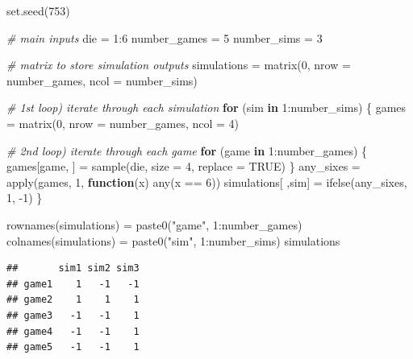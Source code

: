 \documentclass[
]{book}
\newenvironment{Shaded}{\begin{snugshade}}{\end{snugshade}}
\newcommand{\AttributeTok}[1]{\textcolor[rgb]{0.77,0.63,0.00}{#1}}
\newcommand{\CommentTok}[1]{\textcolor[rgb]{0.56,0.35,0.01}{\textit{#1}}}
\newcommand{\ConstantTok}[1]{\textcolor[rgb]{0.00,0.00,0.00}{#1}}
\newcommand{\ControlFlowTok}[1]{\textcolor[rgb]{0.13,0.29,0.53}{\textbf{#1}}}
\newcommand{\DecValTok}[1]{\textcolor[rgb]{0.00,0.00,0.81}{#1}}
\newcommand{\FunctionTok}[1]{\textcolor[rgb]{0.00,0.00,0.00}{#1}}
\newcommand{\NormalTok}[1]{#1}
\newcommand{\OtherTok}[1]{\textcolor[rgb]{0.56,0.35,0.01}{#1}}
\newcommand{\SpecialCharTok}[1]{\textcolor[rgb]{0.00,0.00,0.00}{#1}}
\newcommand{\StringTok}[1]{\textcolor[rgb]{0.31,0.60,0.02}{#1}}
\begin{document}
\begin{Shaded}
\begin{Highlighting}[]
\FunctionTok{set.seed}\NormalTok{(}\DecValTok{753}\NormalTok{)}

\CommentTok{\# main inputs}
\NormalTok{die }\OtherTok{=} \DecValTok{1}\SpecialCharTok{:}\DecValTok{6}
\NormalTok{number\_games }\OtherTok{=} \DecValTok{5}
\NormalTok{number\_sims }\OtherTok{=} \DecValTok{3}

\CommentTok{\# matrix to store simulation outputs}
\NormalTok{simulations }\OtherTok{=} \FunctionTok{matrix}\NormalTok{(}\DecValTok{0}\NormalTok{, }\AttributeTok{nrow =}\NormalTok{ number\_games, }\AttributeTok{ncol =}\NormalTok{ number\_sims)}

\CommentTok{\# 1st loop) iterate through each simulation}
\ControlFlowTok{for}\NormalTok{ (sim }\ControlFlowTok{in} \DecValTok{1}\SpecialCharTok{:}\NormalTok{number\_sims) \{}
\NormalTok{  games }\OtherTok{=} \FunctionTok{matrix}\NormalTok{(}\DecValTok{0}\NormalTok{, }\AttributeTok{nrow =}\NormalTok{ number\_games, }\AttributeTok{ncol =} \DecValTok{4}\NormalTok{)}
  
  \CommentTok{\# 2nd loop) iterate through each game}
  \ControlFlowTok{for}\NormalTok{ (game }\ControlFlowTok{in} \DecValTok{1}\SpecialCharTok{:}\NormalTok{number\_games) \{}
\NormalTok{    games[game, ] }\OtherTok{=} \FunctionTok{sample}\NormalTok{(die, }\AttributeTok{size =} \DecValTok{4}\NormalTok{, }\AttributeTok{replace =} \ConstantTok{TRUE}\NormalTok{)}
\NormalTok{  \}}
\NormalTok{  any\_sixes }\OtherTok{=} \FunctionTok{apply}\NormalTok{(games, }\DecValTok{1}\NormalTok{, }\ControlFlowTok{function}\NormalTok{(x) }\FunctionTok{any}\NormalTok{(x }\SpecialCharTok{==} \DecValTok{6}\NormalTok{))}
\NormalTok{  simulations[ ,sim] }\OtherTok{=} \FunctionTok{ifelse}\NormalTok{(any\_sixes, }\DecValTok{1}\NormalTok{, }\SpecialCharTok{{-}}\DecValTok{1}\NormalTok{)}
\NormalTok{\}}

\FunctionTok{rownames}\NormalTok{(simulations) }\OtherTok{=} \FunctionTok{paste0}\NormalTok{(}\StringTok{"game"}\NormalTok{, }\DecValTok{1}\SpecialCharTok{:}\NormalTok{number\_games)}
\FunctionTok{colnames}\NormalTok{(simulations) }\OtherTok{=} \FunctionTok{paste0}\NormalTok{(}\StringTok{"sim"}\NormalTok{, }\DecValTok{1}\SpecialCharTok{:}\NormalTok{number\_sims)}
\NormalTok{simulations}
\end{Highlighting}
\end{Shaded}

\begin{verbatim}
##       sim1 sim2 sim3
## game1    1   -1   -1
## game2    1    1    1
## game3   -1   -1    1
## game4   -1   -1    1
## game5   -1   -1    1
\end{verbatim}
\end{document}
